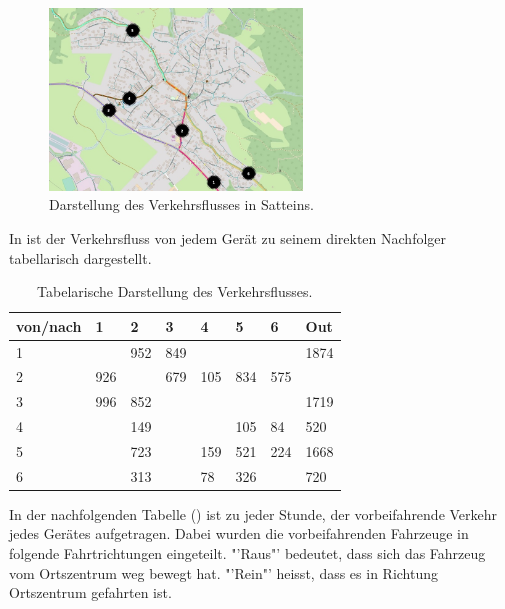 \begin{figure}[H]
  \centering
  \includegraphics[width=0.6\textwidth]{Resultate/Auswertung.jpg} 
  \caption{Darstellung des Verkehrsflusses in Satteins.}
  \label{bAuswertung}
\end{figure}
In  ist der Verkehrsfluss von jedem Gerät zu seinem direkten Nachfolger tabellarisch dargestellt. 

\setlength\tabcolsep{5pt}

\begin{table}[H]
\centering
\begin{tabular}{|p{1.5cm}|p{1.5cm}|p{1.5cm}|p{1.5cm}|p{1.5cm}|p{1.5cm}|p{1.5cm}|p{1.5cm}|}
\hline
	von/nach & 1 & 2 & 3 & 4 & 5 & 6 & Out \\ \hline
	1 &  & 952 & 849 &  &  &  & 1874 \\ \hline
	2 & 926 &  & 679 & 105 & 834 & 575 &  \\ \hline
	3 & 996 & 852 &  &  & &  & 1719 \\ \hline
	4 &  & 149 &  &  & 105 & 84 & 520 \\ \hline
	5 &  & 723 &  & 159 & 521 & 224 & 1668 \\ \hline
	6 &  & 313 &  & 78 & 326 &  & 720 \\ \hline
\end{tabular}
\caption{Tabelarische Darstellung des Verkehrsflusses.}
\label{tVerkehrsfluss}
\end{table}
\setlength\tabcolsep{0pt}

In der nachfolgenden Tabelle () ist zu jeder Stunde, der vorbeifahrende Verkehr jedes Gerätes aufgetragen. Dabei wurden die vorbeifahrenden Fahrzeuge in folgende Fahrtrichtungen eingeteilt. "'Raus"' bedeutet, dass sich das Fahrzeug vom Ortszentrum weg bewegt hat. "'Rein"' heisst, dass es in Richtung Ortszentrum gefahrten ist.

